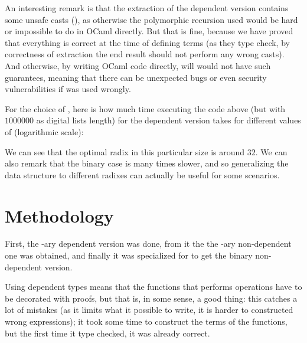 \documentclass{article}
\begin{document}
An interesting remark is that the extraction of the dependent version contains some unsafe casts (), as otherwise the polymorphic recursion used would be hard or impossible to do in OCaml directly. But that is fine, because we have proved that everything is correct at the time of defining terms (as they type check, by correctness of extraction the end result should not perform any wrong casts). And otherwise, by writing OCaml code directly, will would not have such guarantees, meaning that there can be unexpected bugs or even security vulnerabilities if  was used wrongly.

For the choice of , here is how much time executing the code above (but with $1000000$ as digital lists length) for the dependent version takes for different values of  (logarithmic scale):

\begin{center}
\end{center}

We can see that the optimal radix in this particular size is around $32$. We can also remark that the binary case is many times slower, and so generalizing the data structure to different radixes can actually be useful for some scenarios.

\section{Methodology}

First, the -ary dependent version was done, from it the the -ary non-dependent one was obtained, and finally it was specialized for  to get the binary non-dependent version.

Using dependent types means that the functions that performs operations have to be decorated with proofs, but that is, in some sense, a good thing: this catches a lot of mistakes (as it limits what it possible to write, it is harder to constructed wrong expressions); it took some time to construct the terms of the functions, but the first time it type checked, it was already correct.
\end{document}
